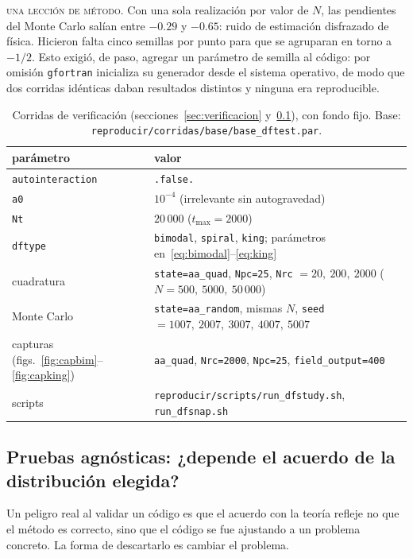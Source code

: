 \documentclass[11pt,a4paper]{article}
\theoremstyle{definition}
\begin{document}
\begin{aviso}
\textsc{una lección de método.} Con una sola realización por valor de $N$, las
pendientes del Monte Carlo salían entre $-0.29$ y $-0.65$: ruido de estimación
disfrazado de física. Hicieron falta cinco semillas por punto para que se
agruparan en torno a $-1/2$. Esto exigió, de paso, agregar un parámetro de semilla
al código: por omisión \texttt{gfortran} inicializa su generador desde el sistema
operativo, de modo que dos corridas idénticas daban resultados distintos y
ninguna era reproducible.
\end{aviso}

\begin{table}[ht]
\centering
\small
\caption{Corridas de verificación (secciones~\ref{sec:verificacion} y~\ref{sec:agnosticas}),
con fondo fijo. Base: \texttt{reproducir/corridas/base/base\_dftest.par}.}
\label{tab:verificacion}
\begin{tabular}{ll}
\toprule
parámetro & valor \\
\midrule
\texttt{autointeraction} & \texttt{.false.} \\
\texttt{a0} & $10^{-4}$ (irrelevante sin autogravedad) \\
\texttt{Nt} & $20\,000$ ($t_{\max}=2000$) \\
\texttt{dftype} & \texttt{bimodal}, \texttt{spiral}, \texttt{king}; parámetros en~\eqref{eq:bimodal}--\eqref{eq:king} \\
cuadratura & \texttt{state=aa\_quad}, \texttt{Npc=25}, \texttt{Nrc} $=20,\ 200,\ 2000$ ($N=500,\ 5000,\ 50\,000$) \\
Monte Carlo & \texttt{state=aa\_random}, mismas $N$, \texttt{seed} $=1007,\ 2007,\ 3007,\ 4007,\ 5007$ \\
capturas (figs.~\ref{fig:capbim}--\ref{fig:capking}) & \texttt{aa\_quad}, \texttt{Nrc=2000}, \texttt{Npc=25}, \texttt{field\_output=400} \\
\midrule
scripts & \texttt{reproducir/scripts/run\_dfstudy.sh}, \texttt{run\_dfsnap.sh} \\
\bottomrule
\end{tabular}
\end{table}

\subsection{Pruebas agnósticas: ¿depende el acuerdo de la distribución elegida?}
\label{sec:agnosticas}

Un peligro real al validar un código es que el acuerdo con la teoría refleje no
que el método es correcto, sino que el código se fue ajustando a un problema
concreto. La forma de descartarlo es cambiar el problema.
\end{document}
